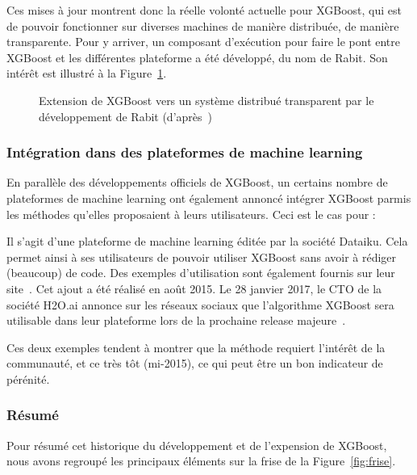 Ces mises à jour montrent donc la réelle volonté actuelle pour XGBoost, qui est de pouvoir fonctionner sur diverses machines de manière distribuée, de manière transparente. Pour y arriver, un composant d'exécution pour faire le pont entre XGBoost et les différentes plateforme a été développé, du nom de Rabit. Son intérêt est illustré à la Figure~\ref{fig:dev_trois}.

\begin{figure}[h]
	\begin{margincap}
		\centering
	  	\resizebox{.98\textwidth}{!}{%
		}
		\caption{Extension de XGBoost vers un système distribué transparent par le développement de Rabit (d'après~\cite{bib:xgboost-author})}
		\label{fig:dev_trois}
	\end{margincap}
\end{figure}

\subsubsection{Intégration dans des plateformes de machine learning}
En parallèle des développements \og officiels\fg{} de XGBoost, un certains nombre de plateformes de machine learning ont également annoncé intégrer XGBoost parmis les méthodes qu'elles proposaient à leurs utilisateurs. Ceci est le cas pour :
\begin{itemize}
	Il s'agit d'une plateforme de machine learning éditée par la société Dataiku. Cela permet ainsi à ses utilisateurs de pouvoir utiliser XGBoost sans avoir à rédiger (beaucoup) de code. Des exemples d'utilisation sont également fournis sur leur site~\cite{bib:xgboost-dataiku}. Cet ajout a été réalisé en août 2015.
	Le 28 janvier 2017, le CTO de la société H2O.ai annonce sur les réseaux sociaux que l'algorithme XGBoost sera utilisable dans leur plateforme lors de la prochaine release majeure~\cite{bib:xgboost-hdeuxo}.
\end{itemize}
Ces deux exemples tendent à montrer que la méthode requiert l'intérêt de la communauté, et ce très tôt (mi-2015), ce qui peut être un bon indicateur de pérénité.

\subsubsection{Résumé}
Pour résumé cet historique du développement et de l'expension de XGBoost, nous avons regroupé les principaux éléments sur la frise de la Figure~\ref{fig:frise}.

